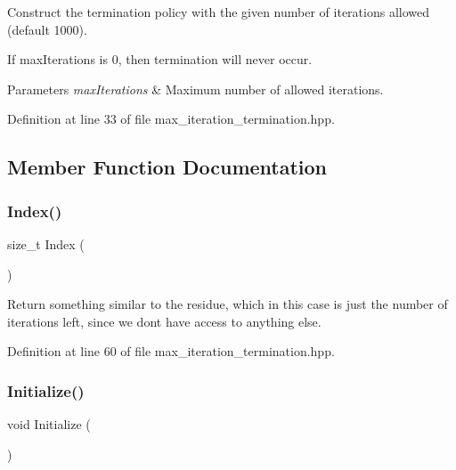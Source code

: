 Construct the termination policy with the given number of iterations allowed (default 1000). 

If max\+Iterations is 0, then termination will never occur.


\begin{DoxyParams}{Parameters}
{\em max\+Iterations} & Maximum number of allowed iterations. \\
\hline
\end{DoxyParams}


Definition at line 33 of file max\+\_\+iteration\+\_\+termination.\+hpp.



\subsection{Member Function Documentation}
\mbox{\label{classmlpack_1_1amf_1_1MaxIterationTermination_af9bd9c065fa0b8e0da8c57b0ab46b870}} 
\subsubsection{Index()}
{\footnotesize\ttfamily size\+\_\+t Index (\begin{DoxyParamCaption}{ }\end{DoxyParamCaption})\hspace{0.3cm}{\ttfamily [inline]}}



Return something similar to the residue, which in this case is just the number of iterations left, since we don\textquotesingle{}t have access to anything else. 



Definition at line 60 of file max\+\_\+iteration\+\_\+termination.\+hpp.

\mbox{\label{classmlpack_1_1amf_1_1MaxIterationTermination_a24e5b85350a8b4b867486aa24334fa35}} 
\subsubsection{Initialize()}
{\footnotesize\ttfamily void Initialize (\begin{DoxyParamCaption}\item[{const Mat\+Type \&}]{ }\end{DoxyParamCaption})\hspace{0.3cm}{\ttfamily [inline]}}



